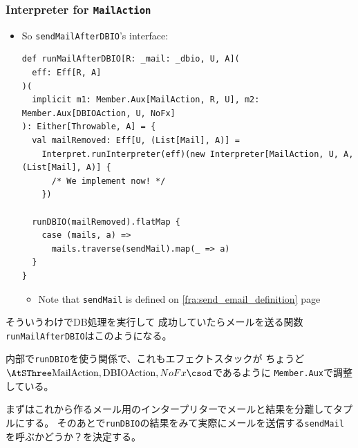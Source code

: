 \begin{frame}[fragile]
  \frametitle{Interpreter for \lstinline|MailAction|}

  \begin{itemize}
    \item So \lstinline|sendMailAfterDBIO|'s interface:
\begin{lstlisting}[style=scala]
def runMailAfterDBIO[R: _mail: _dbio, U, A](
  eff: Eff[R, A]
)(
  implicit m1: Member.Aux[MailAction, R, U], m2: Member.Aux[DBIOAction, U, NoFx]
): Either[Throwable, A] = {
  val mailRemoved: Eff[U, (List[Mail], A)] =
    Interpret.runInterpreter(eff)(new Interpreter[MailAction, U, A, (List[Mail], A)] {
      /* We implement now! */
    })

  runDBIO(mailRemoved).flatMap {
    case (mails, a) => 
      mails.traverse(sendMail).map(_ => a)
  }
}
\end{lstlisting}

    \begin{itemize}
      \item Note that \lstinline|sendMail| is defined on \ref{fra:send_email_definition} page
    \end{itemize}
  \end{itemize}

  \begin{notes}
    \item そういうわけでDB処理を実行して
    成功していたらメールを送る関数\lstinline|runMailAfterDBIO|はこのようになる。

    \item 内部で\lstinline|runDBIO|を使う関係で、これもエフェクトスタックが
    ちょうど$\SThree{\lstinline|MailAction|,\lstinline|DBIOAction|,NoFx}$であるように
    \lstinline|Member.Aux|で調整している。

    \item まずはこれから作るメール用のインタープリターでメールと結果を分離してタプルにする。
    そのあとで\lstinline|runDBIO|の結果をみて実際にメールを送信する\lstinline|sendMail|
    を呼ぶかどうか？を決定する。
  \end{notes}
\end{frame}

